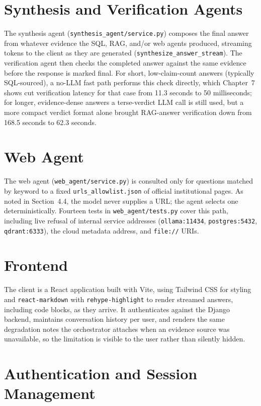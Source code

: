 \documentclass[11pt,a4paper,oneside]{report}
\begin{document}
\section{Synthesis and Verification Agents}

The synthesis agent (\texttt{synthesis\_agent/service.py}) composes the final
answer from whatever evidence the SQL, RAG, and/or web agents produced,
streaming tokens to the client as they are generated
(\texttt{synthesize\_answer\_stream}). The verification agent then checks the
completed answer against the same evidence before the response is marked
final. For short, low-claim-count answers (typically SQL-sourced), a
no-LLM fast path performs this check directly, which Chapter~7 shows cut
verification latency for that case from 11.3 seconds to 50 milliseconds; for
longer, evidence-dense answers a terse-verdict LLM call is still used, but a
more compact verdict format alone brought RAG-answer verification down from
168.5 seconds to 62.3 seconds.

\section{Web Agent}

The web agent (\texttt{web\_agent/service.py}) is consulted only for
questions matched by keyword to a fixed \texttt{urls\_allowlist.json} of
official institutional pages. As noted in Section~4.4, the model never
supplies a URL; the agent selects one deterministically. Fourteen tests in
\texttt{web\_agent/tests.py} cover this path, including live refusal of
internal service addresses (\texttt{ollama:11434}, \texttt{postgres:5432},
\texttt{qdrant:6333}), the cloud metadata address, and \texttt{file://} URIs.

\section{Frontend}

The client is a React application built with Vite, using Tailwind CSS for
styling and \texttt{react-markdown} with \texttt{rehype-highlight} to render
streamed answers, including code blocks, as they arrive. It authenticates
against the Django backend, maintains conversation history per user, and
renders the same degradation notes the orchestrator attaches when an
evidence source was unavailable, so the limitation is visible to the user
rather than silently hidden.

\section{Authentication and Session Management}
\end{document}
